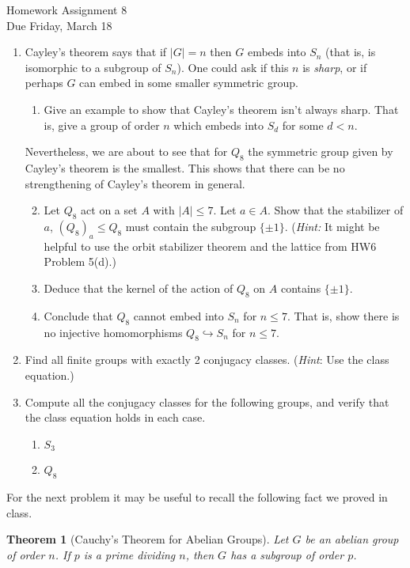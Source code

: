 \documentclass[11pt]{article}
\newtheorem{theorem}{Theorem}
\begin{document}
\begin{center}
\Large {Homework Assignment 8}\\
\small {Due Friday, March 18}
\end{center}
\begin{enumerate}
  \item Cayley's theorem says that if $|G|=n$ then $G$ embeds into $S_n$ (that is, is isomorphic to a subgroup of $S_n$).  One could ask if this $n$ is \textit{sharp}, or if perhaps $G$ can embed in some smaller symmetric group.
  \begin{enumerate}
  \item{Give an example to show that Cayley's theorem isn't always sharp.  That is, give a group of order $n$ which embeds into $S_d$ for some $d<n$.}
  \end{enumerate}
    Nevertheless, we are about to see that for $Q_8$ the symmetric group given by Cayley's theorem is the smallest.  This shows that there can be no strengthening of Cayley's theorem in general.
  \begin{enumerate}
  \setcounter{enumii}{1}
    \item Let $Q_8$ act on a set $A$ with $|A|\le 7$.  Let $a\in A$.  Show that the stabilizer of $a$,  $(Q_8)_a\le Q_8$ must contain the subgroup $\{\pm1\}$.  (\textit{Hint:} It might be helpful to use the orbit stabilizer theorem and the lattice from HW6 Problem 5(d).)
    \item Deduce that the kernel of the action of $Q_8$ on $A$ contains $\{\pm1\}$.
    \item Conclude that $Q_8$ cannot embed into $S_n$ for $n\le7$.  That is, show there is no injective homomorphisms $Q_8\hookrightarrow S_n$ for $n\le7$.
  \end{enumerate}
    \item Find all finite groups with exactly 2 conjugacy classes.  (\textit{Hint}: Use the class equation.)
    \item Compute all the conjugacy classes for the following groups, and verify that the class equation holds in each case.
    \begin{enumerate}
    \item $S_3$
    \item $Q_8$
    \end{enumerate}
    \end{enumerate}
    For the next problem it may be useful to recall the following fact we proved in class.
    \begin{theorem}[Cauchy's Theorem for Abelian Groups]
    Let $G$ be an abelian group of order $n$.  If $p$ is a prime dividing $n$, then $G$ has a subgroup of order $p$.
    \end{theorem}
\end{document}
